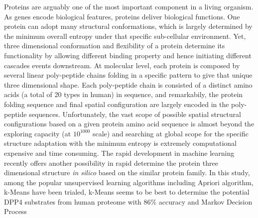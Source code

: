 Proteins are arguably one of the most important component in a living organism. As genes encode biological features, proteins deliver biological functions. One protein can adopt many structural conformations, which is largely determined by the minimum overall entropy under that specific sub-cellular environment. Yet, three dimensional conformation and flexibility of a protein determine its functionality by allowing different binding property and hence initiating different cascades events downstream. At molecular level, each protein is composed by several linear poly-peptide chains folding in a specific pattern to give that unique three dimensional shape. Each poly-peptide chain is consisted of a distinct amino acids (a total of 20 types in human) in sequence, and remarkabily, the protein folding sequence and final spatial configuration are largely encoded in the poly-peptide sequences. Unfortunately, the vast scope of possible spatial structural configurations based on a given protein amino acid sequence is almost beyond the exploring capacity (at $10^{1000}$ scale) and searching at global scope for the specific structure adaptation with the minimum entropy is extremely computational expensive and time consuming. The rapid development in machine learning recently offers another possibility in rapid determine the protein three dimensional structure \textit{in silico} based on the similar protein family. In this study, among the popular unsupervised learning algorithms including Apriori algorithm, k-Means have been trialed, k-Means seems to be best to determine the potential DPP4 substrates from human proteome with 86\% accuracy and Markov Decision Process 